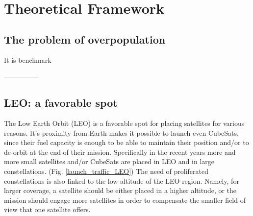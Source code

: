 \chapter{Theoretical Framework}
\label{chap:2}

\section{The problem of overpopulation}
\bigskip

It is benchmark 




---------------

\section{LEO: a favorable spot}
\bigskip

The Low Earth Orbit (LEO) is a favorable spot for placing satellites for various reasons. It's proximity from Earth makes it possible to launch even CubeSats, since their fuel capacity is enough to be able to maintain their position and/or to de-orbit at the end of their mission. Specifically in the recent years more and more small satellites and/or CubeSats are placed in LEO and in large constellations. (Fig. \ref{launch_traffic_LEO}) The need of proliferated constellations is also linked to the low altitude of the LEO region. Namely, for larger coverage, a satellite should be either placed in a higher altitude, or the mission should engage more satellites in order to compensate the smaller field of view that one satellite offers.


